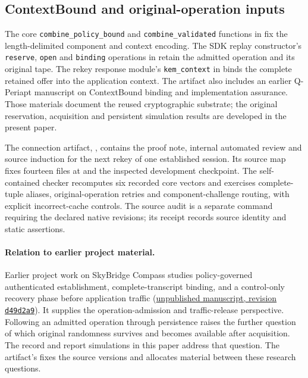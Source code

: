\subsection{ContextBound and original-operation inputs}
\label{app:contextbound-source}

The core \texttt{combine\_policy\_bound} and \texttt{combine\_validated}
functions in
\href{https://github.com/billlza/q-periapt/blob/228c944fc476e3e57d6c08063cacb19bca5b360e/crates/q-periapt-core/src/lib.rs}{}
fix the length-delimited component and context encoding. The SDK replay
constructor's \texttt{reserve}, \texttt{open} and \texttt{binding} operations in
\href{https://github.com/billlza/q-periapt/blob/228c944fc476e3e57d6c08063cacb19bca5b360e/crates/q-periapt-sdk/src/expert/replay.rs}{}
retain the admitted operation and its original tape. The rekey response
module's \texttt{kem\_context} in
\href{https://github.com/billlza/q-periapt/blob/228c944fc476e3e57d6c08063cacb19bca5b360e/research/continuity-identity-candidate/src/durable/messages/rekey/response.rs}{}
binds the complete retained offer into the application context.
The artifact also includes an earlier Q-Periapt manuscript on ContextBound
binding and implementation assurance. Those materials document the reused
cryptographic substrate; the original reservation, acquisition and persistent
simulation results are developed in the present paper.

The connection artifact, ,
contains the proof note, internal automated review and source induction for the
next rekey of one established session. Its source map fixes fourteen files
at \sourcecommit{} and the inspected development checkpoint. The
self-contained checker recomputes six recorded core vectors and exercises
complete-tuple aliases, original-operation retries and component-challenge
routing, with explicit incorrect-cache controls. The source audit is a
separate command requiring the declared native revisions; its receipt records
source identity and static assertions.

\paragraph{Relation to earlier project material.}
Earlier project work on SkyBridge Compass studies policy-governed
authenticated establishment, complete-transcript binding, and a control-only
recovery phase before application traffic
(\href{https://github.com/billlza/Skybridge-Compass/blob/d49d2a9ed4e1fb00905adeb06c02989562e375af/Docs/TDSC-2026-01-0318_IEEE_Paper_SkyBridge_Compass_patched.tex}{unpublished manuscript, revision \texttt{d49d2a9}}).
It supplies the operation-admission and traffic-release perspective.
Following an admitted operation through persistence raises the further
question of which original randomness survives and becomes available
after acquisition. The record and report simulations in this paper
address that question. The artifact's
 fixes the source versions and allocates material
between these research questions.


